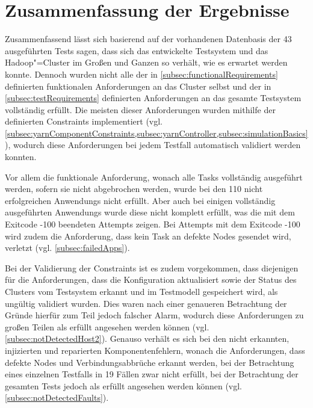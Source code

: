 \section{Zusammenfassung der Ergebnisse}
\label{sec:evaluationResults}

Zusammenfassend lässt sich basierend auf der vorhandenen Datenbasis der 43 ausgeführten \glspl{Test} sagen, dass sich das entwickelte Testsystem und das Hadoop"=Cluster im Großen und Ganzen so verhält, wie es erwartet werden konnte.
Dennoch wurden nicht alle der in \cref{subsec:functionalRequirements} definierten funktionalen Anforderungen an das Cluster selbst und der in \cref{subsec:testRequirements} definierten Anforderungen an das gesamte Testsystem vollständig erfüllt.
Die meisten dieser Anforderungen wurden mithilfe der definierten Constraints implementiert (vgl. \cref{subsec:yarnComponentConstraints,subsec:yarnController,subsec:simulationBasics}), wodurch diese Anforderungen bei jedem \gls{Testfall} automatisch validiert werden konnten.

Vor allem die funktionale Anforderung, wonach alle Tasks vollständig ausgeführt werden, sofern sie nicht abgebrochen werden, wurde bei den 110 nicht erfolgreichen \glspl{Anwendung} nicht erfüllt.
Aber auch bei einigen vollständig ausgeführten \glspl{Anwendung} wurde diese nicht komplett erfüllt, was die mit dem Exitcode -100 beendeten \glspl{Attempt} zeigen.
Bei \glspl{Attempt} mit dem Exitcode -100 wird zudem die Anforderung, dass kein Task an defekte Nodes gesendet wird, verletzt (vgl. \cref{subsec:failedApps}).

Bei der Validierung der Constraints ist es zudem vorgekommen, dass diejenigen für die Anforderungen, dass die Konfiguration aktualisiert sowie der Status des Clusters vom Testsystem erkannt und im Testmodell gespeichert wird, als ungültig validiert wurden.
Dies waren nach einer genaueren Betrachtung der Gründe hierfür zum Teil jedoch falscher Alarm, wodurch diese Anforderungen zu großen Teilen als erfüllt angesehen werden können (vgl. \cref{subsec:notDetectedHost2}).
Genauso verhält es sich bei den nicht erkannten, injizierten und reparierten Komponentenfehlern, wonach die Anforderungen, dass defekte Nodes und Verbindungsabbrüche erkannt werden, bei der Betrachtung eines einzelnen Testfalls in 19 Fällen zwar nicht erfüllt, bei der Betrachtung der gesamten \glspl{Test} jedoch als erfüllt angesehen werden können (vgl. \cref{subsec:notDetectedFaults}).

